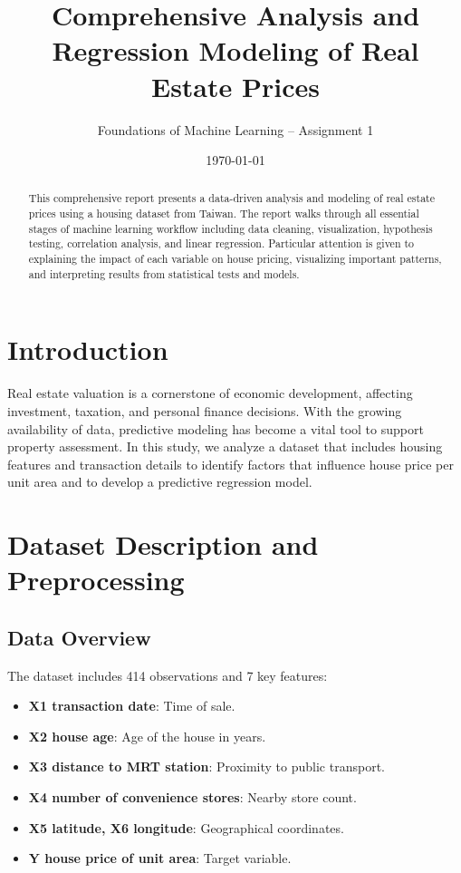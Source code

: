 \documentclass[12pt]{article}
\title{Comprehensive Analysis and Regression Modeling of Real Estate Prices}
\author{Foundations of Machine Learning – Assignment 1}
\date{\today}
\begin{document}
\maketitle

\begin{abstract}
This comprehensive report presents a data-driven analysis and modeling of real estate prices using a housing dataset from Taiwan. The report walks through all essential stages of machine learning workflow including data cleaning, visualization, hypothesis testing, correlation analysis, and linear regression. Particular attention is given to explaining the impact of each variable on house pricing, visualizing important patterns, and interpreting results from statistical tests and models.
\end{abstract}

\section{Introduction}
Real estate valuation is a cornerstone of economic development, affecting investment, taxation, and personal finance decisions. With the growing availability of data, predictive modeling has become a vital tool to support property assessment. In this study, we analyze a dataset that includes housing features and transaction details to identify factors that influence house price per unit area and to develop a predictive regression model.

\section{Dataset Description and Preprocessing}
\subsection{Data Overview}
The dataset includes 414 observations and 7 key features:
\begin{itemize}
    \item \textbf{X1 transaction date}: Time of sale.
    \item \textbf{X2 house age}: Age of the house in years.
    \item \textbf{X3 distance to MRT station}: Proximity to public transport.
    \item \textbf{X4 number of convenience stores}: Nearby store count.
    \item \textbf{X5 latitude, X6 longitude}: Geographical coordinates.
    \item \textbf{Y house price of unit area}: Target variable.
\end{itemize}
\end{document}
